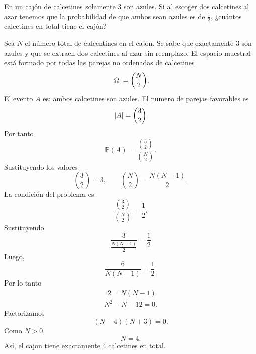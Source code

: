 \documentclass[12pt,a4paper]{article}
\begin{document}
    \begin{mdframed}[style=mdbluebox,frametitle={Ejercicio 3}]
        En un cajón de calcetines solamente $3$ son azules. Si al escoger dos calcetines al azar 
        tenemos que la probabilidad de que ambos sean azules es de $\frac{1}{2}$, 
        ¿cuántos calcetines en total tiene el cajón?
    \end{mdframed}

    \begin{solucion}
        Sea $N$ el número total de calcentines en el cajón. Se sabe que exactamente 3 son azules y que se extraen
        dos calcetines al azar sin reemplazo. El espacio muestral está formado por todas las parejas no ordenadas
        de calcetines
        \begin{equation*}
            \abs{\Omega}=\binom{N}{2}.
        \end{equation*}
        El evento $A$ es: ambos calcetines son azules. El numero de parejas favorables es
        \begin{equation*}
            \abs{A}=\binom{3}{2}
        \end{equation*}
        Por tanto
        \begin{equation*}
            \mathbb{P}(A)=\frac{\binom{3}{2}}{\binom{N}{2}}.
        \end{equation*}
        Sustituyendo los valores
        \begin{equation*}
            \binom{3}{2}=3, \qquad \binom{N}{2}=\frac{N(N-1)}{2}.
        \end{equation*}
        La condición del problema es
        \begin{equation*}
            \frac{\binom{3}{2}}{\binom{N}{2}}=\frac{1}{2}.
        \end{equation*}
        Sustituyendo
        \begin{equation*}
            \frac{3}{\frac{N(N-1)}{2}}=\frac{1}{2}
        \end{equation*}
        Luego,
        \begin{equation*}
            \frac{6}{N(N-1)}=\frac{1}{2}.
        \end{equation*}
        Por lo tanto
        \begin{align*}
            12=N(N-1)\\
            N^{2}-N-12=0.
        \end{align*}
        Factorizamos 
        \begin{equation*}
            (N-4)(N+3)=0.
        \end{equation*}
        Como $N\gt0$,
        \begin{equation*}
            N=4.
        \end{equation*}
        Así, el cajon tiene exactamente 4 calcetines en total.
    \end{solucion}
\end{document}
